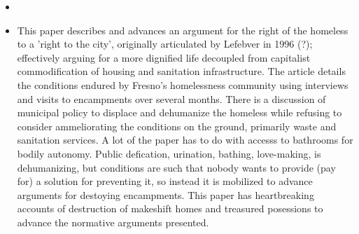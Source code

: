 \documentclass{article} \usepackage{filecontents}
\begin{document}
\begin{itemize}
\item \cite {speer2016RightInfrastructure}
\item This paper describes and advances an argument for the right of
  the homeless to a 'right to the city', originally articulated by
  Lefebver in 1996 (?); effectively arguing for a more dignified life
  decoupled from capitalist commodification of housing and sanitation
  infrastructure. The article details the conditions endured by
  Fresno's homelessness community using interviews and visits to
  encampments over several months. There is a discussion of municipal
  policy to displace and dehumanize the homeless while refusing to
  consider ammeliorating the conditions on the ground, primarily waste
  and sanitation services. A lot of the paper has to do with accesss
  to bathrooms for bodily autonomy. Public defication, urination,
  bathing, love-making, is dehumanizing, but conditions are such that
  nobody wants to provide (pay for) a solution for preventing it, so
  instead it is mobilized to advance arguments for destoying
  encampments. This paper has heartbreaking accounts of destruction of
  makeshift homes and treasured posessions to advance the normative
  arguments presented.

  
\end{itemize}
\end{document}
